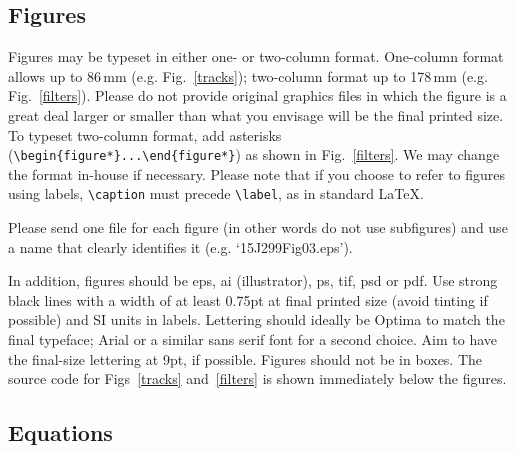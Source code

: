 \documentclass[review,oneside]{igs}
\begin{document}
\subsection{Figures}

Figures may be typeset in either one- or two-column format. One-column format allows up to 86$\,$mm (e.g. Fig.~\ref{tracks}); two-column format up to 178$\,$mm (e.g. Fig.~\ref{filters}). Please do not provide original graphics files in which the figure is a great deal larger or smaller than what you envisage will be the final printed size. To typeset two-column format, add asterisks (\verb"\begin{figure*}...\end{figure*}") as shown in Fig.~\ref{filters}. We may change the format in-house if necessary. Please note that if you choose to refer to figures using labels, \verb"\caption" must precede \verb"\label", as in standard \LaTeX. 

Please send one file for each figure (in other words do not use subfigures) and use a name that clearly identifies it (e.g. `15J299Fig03.eps').

In addition, figures should be eps, ai (illustrator), ps, tif, psd or pdf. Use strong black lines with a width of at least 0.75pt at final printed size (avoid tinting if possible) and SI units in labels. Lettering should ideally be Optima to match the final typeface; Arial or a similar sans serif font for a second choice. Aim to have the final-size lettering at 9pt, if possible. Figures should not be in boxes. The source code for Figs~\ref{tracks} and~\ref{filters} is shown immediately below the figures.


\subsection{Equations}
\end{document}
